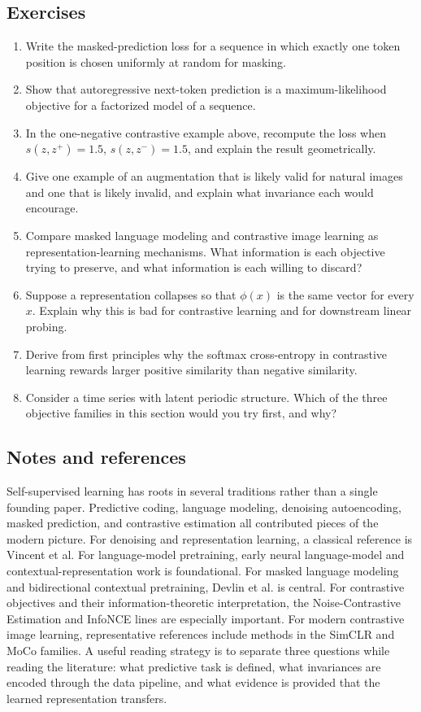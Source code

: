 \subsection*{Exercises}

\begin{enumerate}
    \item Write the masked-prediction loss for a sequence in which exactly one token position is chosen uniformly at random for masking.
    \item Show that autoregressive next-token prediction is a maximum-likelihood objective for a factorized model of a sequence.
    \item In the one-negative contrastive example above, recompute the loss when $s(z,z^+) = 1.5$, $s(z,z^-) = 1.5$, and explain the result geometrically.
    \item Give one example of an augmentation that is likely valid for natural images and one that is likely invalid, and explain what invariance each would encourage.
    \item Compare masked language modeling and contrastive image learning as representation-learning mechanisms. What information is each objective trying to preserve, and what information is each willing to discard?
    \item Suppose a representation collapses so that $\phi(x)$ is the same vector for every $x$. Explain why this is bad for contrastive learning and for downstream linear probing.
    \item Derive from first principles why the softmax cross-entropy in contrastive learning rewards larger positive similarity than negative similarity.
    \item Consider a time series with latent periodic structure. Which of the three objective families in this section would you try first, and why?
\end{enumerate}

\subsection*{Notes and references}

Self-supervised learning has roots in several traditions rather than a single founding paper.
Predictive coding, language modeling, denoising autoencoding, masked prediction, and contrastive estimation all contributed pieces of the modern picture.
For denoising and representation learning, a classical reference is Vincent et al.
For language-model pretraining, early neural language-model and contextual-representation work is foundational.
For masked language modeling and bidirectional contextual pretraining, Devlin et al. is central.
For contrastive objectives and their information-theoretic interpretation, the Noise-Contrastive Estimation and InfoNCE lines are especially important.
For modern contrastive image learning, representative references include methods in the SimCLR and MoCo families.
A useful reading strategy is to separate three questions while reading the literature: what predictive task is defined, what invariances are encoded through the data pipeline, and what evidence is provided that the learned representation transfers.
